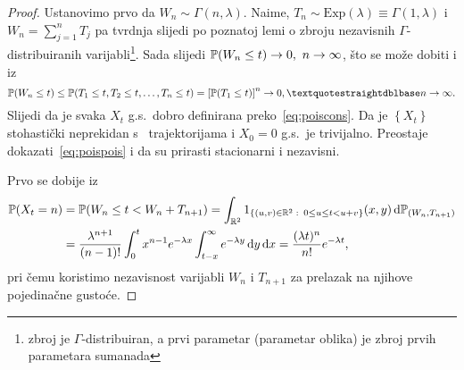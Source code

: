 \documentclass[main.tex]{subfiles}
\begin{document}
\begin{proof}
	Ustanovimo prvo da \( W_n \sim \Gamma(n, \lambda) \). Naime, \( T_n \sim \mathrm{Exp}(\lambda) \equiv \Gamma(1, \lambda) \) i
	\( W_n = \sum_{j=1}^n T_j \) pa tvrdnja slijedi po poznatoj lemi o zbroju nezavisnih \( \Gamma \)-distribuiranih varijabli\footnote{zbroj
		je \( \Gamma \)-distribuiran, a prvi parametar (parametar oblika) je zbroj prvih parametara sumanada}. Sada slijedi \( \mathbb{P}(W_n \le t) \rightarrow 0,\ n \rightarrow \infty \), što se
	može dobiti i iz
	\[
		\P(W_n \le t) \le \P(T_1 \le t, T_2 \le t, \ldots, T_n \le t) = \left[ \P(T_1 \le t) \right]^n \rightarrow 0, \textquotestraightdblbase n \ub.
	\]
	Slijedi da je svaka \( X_t \) g.s.\ dobro definirana preko~\eqref{eq:poiscons}. Da je \( \left\{ X_t \right\} \) stohastički neprekidan
	s \cadlag \ trajektorijama i \( X_0 = 0 \) g.s.\ je trivijalno. Preostaje dokazati~\eqref{eq:poispois} i da su prirasti stacionarni i nezavisni.

	Prvo se dobije iz
	\begin{align}
		\mathbb{P}(X_t = n) & = \mathbb{P}(W_n \le t < W_n + T_{n+1}) =
		\int_{\mathbb{R}^2} 1_{\left\{ (u, v) \in \mathbb{R}^2 \, \colon \, 0 \le u \le t < u+v \right\}}(x,y) \,\mathrm d \mathbb{P}_{(W_n, T_{n+1})} \\ &= \frac{\lambda^{n+1}}{(n-1)!} \int_0^t x^{n-1}e^{-\lambda x} \int_{t-x}^\infty e^{-\lambda y} \,\mathrm d y \,\mathrm d x
		= \frac{(\lambda t)^n}{n!}e^{-\lambda t},
	\end{align}
	pri čemu koristimo nezavisnost varijabli \( W_n \) i \( T_{n+1} \) za prelazak na njihove pojedinačne gustoće.


\end{proof}
\end{document}
